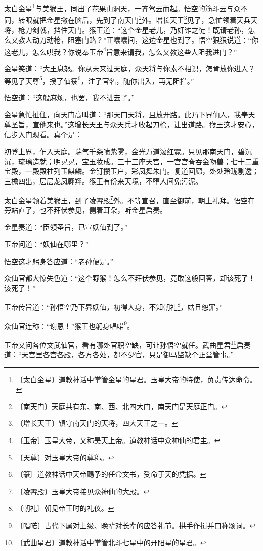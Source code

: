\documentclass[12pt,UTF-8,openany]{ctexbook}
\begin{document}
\begin{large}
    
    太白金星\footnote{〔太白金星〕道教神话中掌管金星的星君。玉皇大帝的特使，负责传达命令。}与美猴王，同出了花果山洞天，一齐驾云而起。悟空的筋斗云与众不同，转眼就把金星撇在脑后，先到了南天门\footnote{〔南天门〕天庭共有东、南、西、北四大门，南天门是天庭正门。}外。增长天王\footnote{〔增长天王〕镇守南天门的天将，四大天王之一。}见了，急忙领着天兵天将，枪刀剑戟，挡住天门。猴王道：“这个金星老儿，乃奸诈之徒！既请老孙，怎么又教人动刀动枪，阻塞门路？”正嚷嚷间，这边金星也到了。悟空狠狠说道：“你这老儿，怎么哄我？你说奉玉帝\footnote{〔玉帝〕玉皇大帝，又称昊天上帝。道教神话中众神仙的君主。}旨意来请我，怎么又教这些人阻我进门？”
    
    金星笑道：“大王息怒。你从未来过天庭，众天将与你素不相识，怎肯放你进入？等见了天尊\footnote{〔天尊〕对玉皇大帝的尊称。}，授了仙箓\footnote{〔箓〕道教神话中天帝赐予的任命文书，受命于天的凭据。}，注了官名，随你出入，再无阻拦。”
    
    悟空道：“这般麻烦，也罢，我不进去了。”
    
    金星急忙扯住，向天门高叫道：“那天门天将，且放开路。此乃下界仙人，我奉天尊圣旨，宣他来也。”这增长天王与众天兵才收起刀枪，让出道路。猴王这才安心，信步入门观看。真个是：
    
    初登上界，乍入天庭。瑞气千条喷紫雾，金光万道滚红霓。只见那南天门，碧沉沉，琉璃造就；明晃晃，宝玉妆成。三十三座天宫，一宫宫脊吞金吻兽；七十二重宝殿，一殿殿柱列玉麒麟。金钉攒玉户，彩凤舞朱门。复道回廊，处处玲珑剔透；三檐四出，层层龙凤翱翔。猴王有份来天境，不堕人间免污泥。
    
    太白金星领着美猴王，到了凌霄殿\footnote{〔凌霄殿〕玉皇大帝接见众神仙的大殿。}外。不等宣召，直至御前，朝上礼拜。悟空在旁站直了，也不拜伏参见，侧着耳朵，听金星启奏。
    
    金星奏道：“臣领圣旨，已宣妖仙到了。”
    
    玉帝问道：“妖仙在哪里？”
    
    悟空这才躬身答应道：“老孙便是。”
    
    众仙官都大惊失色道：“这个野猴！怎么不拜伏参见，竟敢这般回答，却该死了！该死了！”
    
    玉帝传旨道：“孙悟空乃下界妖仙，初得人身，不知朝礼\footnote{〔朝礼〕朝见帝王时的礼仪。}，姑且恕罪。”
    
    众仙官连称：“谢恩！”猴王也躬身唱喏\footnote{〔唱喏〕古代下属对上级、晚辈对长辈的应答礼节。拱手作揖并口称颂词。}。
    
    玉帝又问各位文武仙官，看有哪处官职空缺，可让孙悟空就任。武曲星君\footnote{〔武曲星君〕道教神话中掌管北斗七星中的开阳星的星君。}启奏道：“天宫里各宫各殿，各方各处，都不少官，只是御马监缺个正堂管事。”
    

\end{large}
\end{document}
